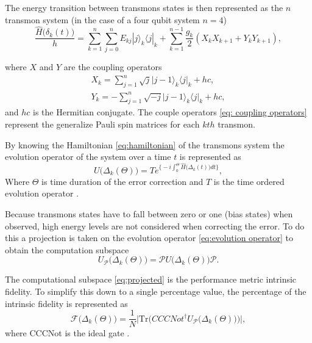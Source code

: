 The energy transition between transmons states is then represented as the $n$ transmon system (in the case of a four qubit system $n=4$)
\begin{equation}
  \label{eq:hamiltonian}
  \frac{\hat{H}\big(\delta_k(t)\big)}{h} = \sum^n_{k=1} \sum^n_{j=0} E_{kj} |j \big\rangle_k \big\langle j|_k + \sum^{n-1}_{k=1} \frac{g_k}{2}(X_kX_{k+1}+Y_{k}Y_{k+1}),  
\end{equation}

where $X$ and $Y$ are the coupling operators \cite{Ghosh2013}
\begin{align}
    \label{eq: coupling operators}
        X_k = \sum^n_{j=1} \sqrt{j}\big| j-1 \big\rangle_k \big\langle j |_k + hc, \\
        Y_k = -\sum^n_{j=1} \sqrt{-j}\big| j-1 \big\rangle_k  \big\langle j |_k + hc,
\end{align}
and $hc$ is the Hermitian conjugate. The couple operators \eqref{eq: coupling operators} represent the generalize Pauli spin matrices for each $kth$ transmon.

By knowing the Hamiltonian \eqref{eq:hamiltonian} of the transmons system the evolution operator of the system over a time $t$ is represented as
\begin{equation}
  \label{eq:evolution operator}
  U\big( \Delta_k(\Theta) \big) = T e^{\Big\{ -i \int_{0}^{\Theta} \hat{H}\big( \Delta_k(t) \big) dt \Big\} }, 
\end{equation}
Where $\Theta$ is time duration of the error correction and $T$ is the time ordered evolution operator \cite{}. 

Because transmons states have to fall between zero or one (bias states) when observed, high energy levels are not considered when correcting the error. To do this a projection is taken on the evolution operator \eqref{eq:evolution operator} to obtain the computation subspace
\begin{equation}
    \label{eq:projected}
    U_{\mathscr{P}} \big(\Delta_k (\Theta) \big) =  \mathscr{P} U \big(\Delta_k(\Theta) \big) \mathscr{P}.
\end{equation}

The computational subspace \eqref{eq:projected} is the performance metric intrinsic fidelity. To simplify this down to a single percentage value, the percentage of the intrinsic fidelity is represented as 
\begin{equation}
    \mathscr{F}\big(\Delta_k(\Theta)\big)=\frac{1}{N}\Bigg| \mathrm{Tr}\bigg( CCCNot^{\dagger} U_\mathscr{P}\big(\Delta_k(\Theta) \big) \bigg) \Bigg|,
\end{equation}
where CCCNot is the ideal gate \cite{}. 

